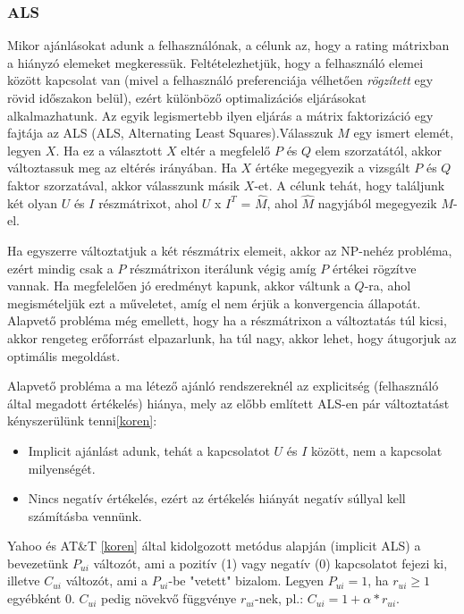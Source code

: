 \documentclass[a4paper,12pt]{article}
\begin{document}
\subsubsection{ALS}
Mikor ajánlásokat adunk a felhasználónak, a célunk az, hogy a rating mátrixban a hiányzó elemeket megkeressük. Feltételezhetjük, hogy a felhasználó elemei között kapcsolat van (mivel a felhasználó preferenciája vélhetően \textsl{rögzített} egy rövid időszakon belül), ezért különböző optimalizációs eljárásokat alkalmazhatunk. Az egyik legismertebb ilyen eljárás a mátrix faktorizáció egy fajtája az ALS (ALS, Alternating Least Squares).Válasszuk $M$ egy ismert elemét, legyen $X$. Ha ez a választott $X$ eltér a megfelelő $P$ és $Q$ elem szorzatától, akkor változtassuk meg az eltérés irányában. Ha $X$ értéke megegyezik a vizsgált $P$ és $Q$ faktor szorzatával, akkor válasszunk másik $X$-et. A célunk tehát, hogy találjunk két olyan $U$ és $I$ részmátrixot, ahol $U$ x $I^T$ = $\hat{M}$, ahol $\hat{M}$ nagyjából megegyezik $M$-el.

Ha egyszerre változtatjuk a két részmátrix elemeit, akkor az NP-nehéz probléma, ezért mindig csak a $P$ részmátrixon iterálunk végig amíg $P$ értékei rögzítve vannak. Ha megfelelően jó eredményt kapunk, akkor váltunk a $Q$-ra, ahol megismételjük ezt a műveletet, amíg el nem érjük a konvergencia állapotát. Alapvető probléma még emellett, hogy ha a részmátrixon a változtatás túl kicsi, akkor rengeteg erőforrást elpazarlunk, ha túl nagy, akkor lehet, hogy átugorjuk az optimális megoldást. \linebreak

Alapvető probléma a ma létező ajánló rendszereknél az explicitség (felhasználó által megadott értékelés) hiánya, mely az előbb említett ALS-en pár változtatást kényszerülünk tenni\ref{koren}:
\begin{itemize}
\item Implicit ajánlást adunk, tehát a kapcsolatot $U$ és $I$ között, nem a kapcsolat milyenségét.
\item Nincs negatív értékelés, ezért az értékelés hiányát negatív súllyal kell számításba vennünk.
\end{itemize}

Yahoo és AT\&T \ref{koren} által kidolgozott metódus alapján (implicit ALS) a bevezetünk $P_{ui}$ változót, ami a pozitív (1) vagy negatív (0) kapcsolatot fejezi ki, illetve $C_{ui}$ változót, ami a $P_{ui}$-be "vetett" bizalom. Legyen $P_{ui} = 1$, ha $r_{ui}\geq1$ egyébként 0. $C_{ui}$ pedig növekvő függvénye $r_{ui}$-nek, pl.: $C_{ui}=1+\alpha*r_{ui}$.
\end{document}
